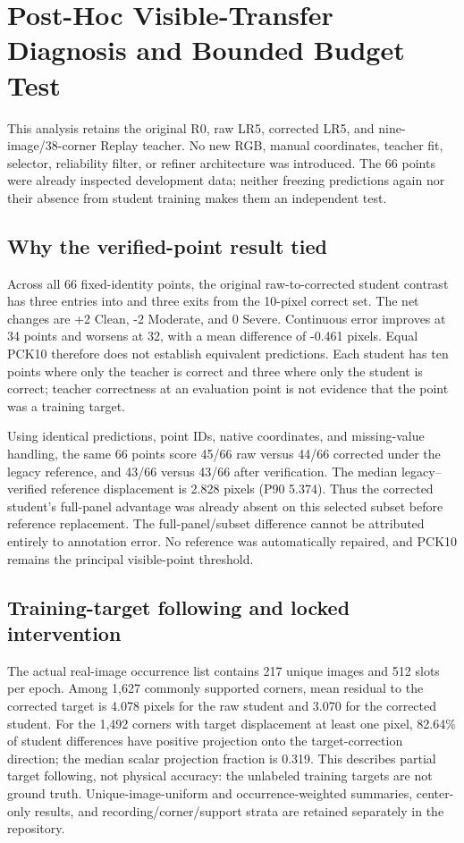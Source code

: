 \section{Post-Hoc Visible-Transfer Diagnosis and Bounded Budget Test}
\label{sec:visibletransfer}
This analysis retains the original R0, raw LR5, corrected LR5, and nine-image/38-corner Replay teacher. No new RGB, manual coordinates, teacher fit, selector, reliability filter, or refiner architecture was introduced. The 66 points were already inspected development data; neither freezing predictions again nor their absence from student training makes them an independent test.

\subsection{Why the verified-point result tied}
Across all 66 fixed-identity points, the original raw-to-corrected student contrast has three entries into and three exits from the 10-pixel correct set. The net changes are +2 Clean, -2 Moderate, and 0 Severe. Continuous error improves at 34 points and worsens at 32, with a mean difference of -0.461 pixels. Equal PCK10 therefore does not establish equivalent predictions. Each student has ten points where only the teacher is correct and three where only the student is correct; teacher correctness at an evaluation point is not evidence that the point was a training target.

Using identical predictions, point IDs, native coordinates, and missing-value handling, the same 66 points score 45/66 raw versus 44/66 corrected under the legacy reference, and 43/66 versus 43/66 after verification. The median legacy--verified reference displacement is 2.828 pixels (P90 5.374). Thus the corrected student's full-panel advantage was already absent on this selected subset before reference replacement. The full-panel/subset difference cannot be attributed entirely to annotation error. No reference was automatically repaired, and PCK10 remains the principal visible-point threshold.

\subsection{Training-target following and locked intervention}
The actual real-image occurrence list contains 217 unique images and 512 slots per epoch. Among 1,627 commonly supported corners, mean residual to the corrected target is 4.078 pixels for the raw student and 3.070 for the corrected student. For the 1,492 corners with target displacement at least one pixel, 82.64\% of student differences have positive projection onto the target-correction direction; the median scalar projection fraction is 0.319. This describes partial target following, not physical accuracy: the unlabeled training targets are not ground truth. Unique-image-uniform and occurrence-weighted summaries, center-only results, and recording/corner/support strata are retained separately in the repository.

